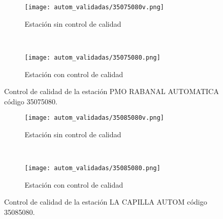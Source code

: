 \begin{figure}[H]
\begin{subfigure}[b]{0.5\textwidth}
\begin{center}
\texttt{[image: autom\_validadas/35075080v.png]}
\caption{Estación sin control de calidad}
        \end{center}
\end{subfigure}
~
\begin{subfigure}[b]{0.5\textwidth}
\begin{center}
\texttt{[image: autom\_validadas/35075080.png]}
\caption{Estación con control de calidad}
\end{center}    
\end{subfigure}
\caption{Control de calidad de la estación PMO RABANAL AUTOMATICA código 35075080.}
\end{figure}    
  
\begin{figure}[H]
\begin{subfigure}[b]{0.5\textwidth}
\begin{center}
\texttt{[image: autom\_validadas/35085080v.png]}
\caption{Estación sin control de calidad}
        \end{center}
\end{subfigure}
~
\begin{subfigure}[b]{0.5\textwidth}
\begin{center}
\texttt{[image: autom\_validadas/35085080.png]}
\caption{Estación con control de calidad}
\end{center}    
\end{subfigure}
\caption{Control de calidad de la estación LA CAPILLA AUTOM código 35085080.}
\end{figure}  